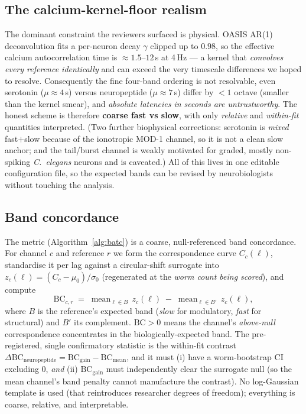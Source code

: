 \documentclass[11pt]{article}
\begin{document}
\subsection{The calcium-kernel-floor realism}
\label{sec:kernel}
The dominant constraint the reviewers surfaced is physical. OASIS AR(1) deconvolution fits a per-neuron
decay $\gamma$ clipped up to $0.98$, so the effective calcium autocorrelation time is $\approx1.5$--$12$\,s
at 4\,Hz --- a kernel that \emph{convolves every reference identically} and can exceed the very
timescale differences we hoped to resolve. Consequently the fine four-band ordering is not resolvable,
even serotonin ($\mu\!\approx\!4$\,s) versus neuropeptide ($\mu\!\approx\!7$\,s) differ by $<1$ octave
(smaller than the kernel smear), and \emph{absolute latencies in seconds are untrustworthy}. The honest
scheme is therefore \textbf{coarse fast vs slow}, with only \emph{relative} and \emph{within-fit}
quantities interpreted. (Two further biophysical corrections: serotonin is \emph{mixed} fast$+$slow
because of the ionotropic MOD-1 channel, so it is not a clean slow anchor; and the tail/burst channel
is weakly motivated for graded, mostly non-spiking \textit{C.\ elegans} neurons and is caveated.) All
of this lives in one editable configuration file, so the expected bands can be revised by
neurobiologists without touching the analysis.

\subsection{Band concordance}
\label{sec:batc}
The metric (Algorithm~\ref{alg:batc}) is a coarse, null-referenced band concordance. For channel $c$
and reference $r$ we form the correspondence curve $C_c(\ell)$, standardise it per lag against a
circular-shift surrogate into $z_c(\ell)=(C_c-\mu_0)/\sigma_0$ (regenerated at the \emph{worm count
being scored}), and compute
\[
  \mathrm{BC}_{c,r} \;=\; \operatorname{mean}_{\ell\in B}\, z_c(\ell)\;-\;
                          \operatorname{mean}_{\ell\in B'}\, z_c(\ell),
\]
where $B$ is the reference's expected band (\emph{slow} for modulatory, \emph{fast} for structural)
and $B'$ its complement. $\mathrm{BC}>0$ means the channel's \emph{above-null} correspondence
concentrates in the biologically-expected band. The pre-registered, single confirmatory statistic is
the within-fit contrast $\Delta\mathrm{BC}_{\text{neuropeptide}}=\mathrm{BC}_{\text{gain}}-
\mathrm{BC}_{\text{mean}}$, and it must (i) have a worm-bootstrap CI excluding 0, \emph{and} (ii)
$\mathrm{BC}_{\text{gain}}$ must independently clear the surrogate null (so the mean channel's
band penalty cannot manufacture the contrast). No log-Gaussian template is used (that reintroduces
researcher degrees of freedom); everything is coarse, relative, and interpretable.
\end{document}

